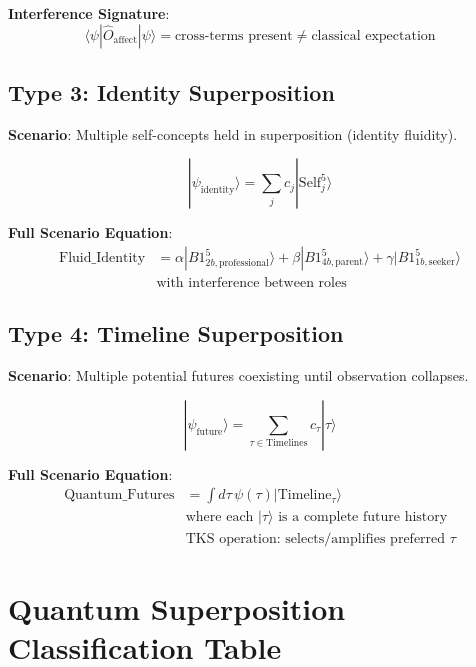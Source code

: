 \documentclass[11pt,twoside]{book}
\begin{document}
\textbf{Interference Signature}:
\[
    \langle\psi|\hat{O}_{\mathrm{affect}}|\psi\rangle
    = \text{cross-terms present} \neq \text{classical expectation}
\]

\subsection{Type 3: Identity Superposition}

\textbf{Scenario}: Multiple self-concepts held in superposition (identity fluidity).

\begin{equation}
\boxed{
    |\psi_{\mathrm{identity}}\rangle = \sum_j c_j |\mathrm{Self}_j^5\rangle
}
\end{equation}

\textbf{Full Scenario Equation}:
\begin{align}
    \text{Fluid\_Identity} &= \alpha |B1^5_{2b,\text{professional}}\rangle
    + \beta |B1^5_{4b,\text{parent}}\rangle
    + \gamma |B1^5_{1b,\text{seeker}}\rangle \\
    &\text{with interference between roles}
\end{align}

\subsection{Type 4: Timeline Superposition}

\textbf{Scenario}: Multiple potential futures coexisting until observation collapses.

\begin{equation}
\boxed{
    |\psi_{\mathrm{future}}\rangle = \sum_{\tau \in \mathrm{Timelines}} c_\tau |\tau\rangle
}
\end{equation}

\textbf{Full Scenario Equation}:
\begin{align}
    \text{Quantum\_Futures} &= \int d\tau \, \psi(\tau) |\mathrm{Timeline}_\tau\rangle \\
    &\text{where each } |\tau\rangle \text{ is a complete future history} \\
    &\text{TKS operation: selects/amplifies preferred } \tau
\end{align}

\section{Quantum Superposition Classification Table}
\end{document}
